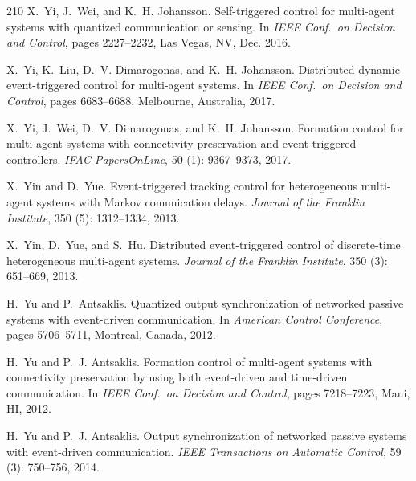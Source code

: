 \documentclass{autart}
\begin{document}
{\begin{thebibliography}{210}
X.~Yi, J.~Wei, and K.~H. Johansson.
\newblock Self-triggered control for multi-agent systems with quantized
  communication or sensing.
\newblock In \emph{{IEEE} Conf.\ on Decision and Control}, pages 2227--2232,
  Las Vegas, NV, Dec. 2016.

X.~Yi, K.~Liu, D.~V. Dimarogonas, and K.~H. Johansson.
\newblock Distributed dynamic event-triggered control for multi-agent systems.
\newblock In \emph{{IEEE} Conf.\ on Decision and Control}, pages 6683--6688,
  Melbourne, Australia, 2017{}.

X.~Yi, J.~Wei, D.~V. Dimarogonas, and K.~H. Johansson.
\newblock Formation control for multi-agent systems with connectivity
  preservation and event-triggered controllers.
\newblock \emph{IFAC-PapersOnLine}, 50 (1): 9367--9373,
  2017{}.

X.~Yin and D.~Yue.
\newblock Event-triggered tracking control for heterogeneous multi-agent
  systems with {M}arkov comunication delays.
\newblock \emph{Journal of the Franklin Institute}, 350 (5):
  1312--1334, 2013.

X.~Yin, D.~Yue, and S.~Hu.
\newblock Distributed event-triggered control of discrete-time heterogeneous
  multi-agent systems.
\newblock \emph{Journal of the Franklin Institute}, 350 (3):
  651--669, 2013.

H.~Yu and P.~Antsaklis.
\newblock Quantized output synchronization of networked passive systems with
  event-driven communication.
\newblock In \emph{{A}merican {C}ontrol {C}onference}, pages 5706--5711,
  Montreal, Canada, 2012{}.

H.~Yu and P.~J. Antsaklis.
\newblock Formation control of multi-agent systems with connectivity
  preservation by using both event-driven and time-driven communication.
\newblock In \emph{{IEEE} Conf.\ on Decision and Control}, pages 7218--7223,
  Maui, HI, 2012{}.

H.~Yu and P.~J. Antsaklis.
\newblock Output synchronization of networked passive systems with event-driven
  communication.
\newblock \emph{IEEE Transactions on Automatic Control}, 59
  (3): 750--756, 2014.


\end{thebibliography}}
\end{document}
